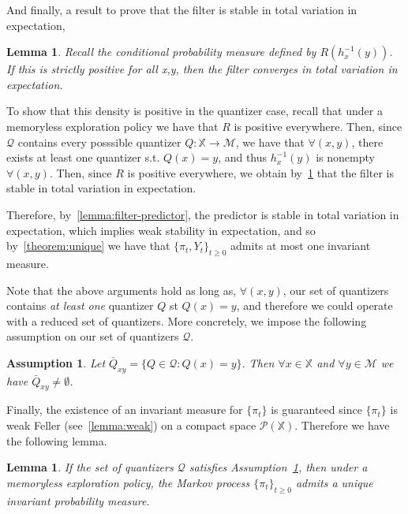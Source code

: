 \documentclass{article}
\newtheorem{lemma}[theorem]{Lemma}
\newtheorem{assumption}{Assumption}[section]
\begin{document}
And finally, a result to prove that the filter is stable in total variation in expectation,

\begin{lemma}\label{lemma:nondegenerate}\cite[Corollary 5.5]{Handel}
    Recall the conditional probability measure defined by \( R(h_x^{-1}(y)) \). If this is strictly positive for all x,y, then the filter converges in total variation in expectation.
\end{lemma}

To show that this density is positive in the quantizer case, recall that under a memoryless exploration policy we have that \(R\) is positive everywhere. Then, since \( \mathcal{Q} \) contains every posssible quantizer \( Q : \mathbb{X} \to \mathcal{M} \), we have that \( \forall (x,y) \), there exists at least one quantizer s.t. \( Q(x) = y \), and thus \( h_x^{-1}(y) \) is nonempty \( \forall (x,y) \). Then, since \(R\) is positive everywhere, we obtain by~\ref{lemma:nondegenerate} that the filter is stable in total variation in expectation.

Therefore, by~\ref{lemma:filter-predictor}, the predictor is stable in total variation in expectation, which implies weak stability in expectation, and so by~\ref{theorem:unique} we have that \( \{\pi_t, Y_t\}_{t\ge0} \) admits at most one invariant measure. %

Note that the above arguments hold as long as, \( \forall (x,y) \), our set of quantizers contains \emph{at least one} quantizer \( Q \) st \( Q(x) = y \), and therefore we could operate with a reduced set of quantizers. More concretely, we impose the following assumption on our set of quantizers \( \mathcal{Q} \). %

\begin{assumption}\label{assumption:one-bin}
    Let \( \bar{Q}_{xy} = \{Q \in \mathcal{Q} : Q(x) = y\} \). Then \( \forall x \in \mathbb{X} \) and \( \forall y \in \mathcal{M} \) we have \(\bar{Q}_{xy} \neq \emptyset \).

\end{assumption}

Finally, the existence of an invariant measure for \( \{\pi_t\} \) is guaranteed since \( \{\pi_t\} \) is weak Feller (see~\ref{lemma:weak}) on a compact space \( \mathcal{P}(\mathbb{X}) \). Therefore we have the following lemma.

\begin{lemma}\label{lemma:invariant}
    If the set of quantizers \( \mathcal{Q} \) satisfies Assumption~\ref{assumption:one-bin}, then under a memoryless exploration policy, the Markov process \( \{\pi_t\}_{t\ge0} \) admits a unique invariant probability measure. %
\end{lemma}
\end{document}
